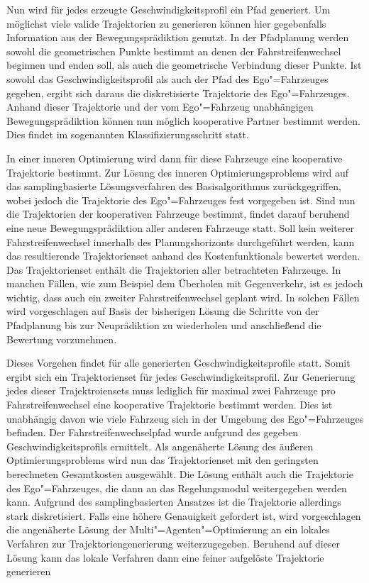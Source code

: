 Nun wird f\"ur jedes erzeugte Geschwindigkeitsprofil ein Pfad generiert.
Um m\"oglichst viele valide Trajektorien zu generieren k\"onnen hier gegebenfalls Information aus der Bewegungspr\"adiktion genutzt.
In der Pfadplanung werden sowohl die geometrischen Punkte bestimmt an denen der Fahrstreifenwechsel beginnen und enden soll, als auch die geometrische Verbindung dieser Punkte.
Ist sowohl das Geschwindigkeitsprofil als auch der Pfad des Ego"=Fahrzeuges gegeben, ergibt sich daraus die diskretisierte Trajektorie des Ego"=Fahrzeuges.
Anhand dieser Trajektorie und der vom Ego"=Fahrzeug unabh\"angigen Bewegungspr\"adiktion k\"onnen nun m\"oglich kooperative Partner bestimmt werden.
Dies findet im sogenannten Klassifizierungsschritt statt.

In einer inneren Optimierung wird dann f\"ur diese Fahrzeuge eine kooperative Trajektorie bestimmt. 
Zur L\"osung des inneren Optimierungsproblems wird auf das samplingbasierte L\"osungsverfahren des Basisalgorithmus zur\"uckgegriffen, wobei jedoch die Trajektorie des Ego"=Fahrzeuges fest vorgegeben ist.
Sind nun die Trajektorien der kooperativen Fahrzeuge bestimmt, findet darauf beruhend eine neue Bewegungspr\"adiktion aller anderen Fahrzeuge statt.
Soll kein weiterer Fahrstreifenwechsel innerhalb des Planungshorizonts durchgef\"uhrt werden, kann das resultierende Trajektorienset anhand des Kostenfunktionals bewertet werden.
Das Trajektorienset enth\"alt die Trajektorien aller betrachteten Fahrzeuge.
In manchen F\"allen, wie zum Beispiel dem \"Uberholen mit Gegenverkehr, ist es jedoch wichtig, dass auch ein zweiter Fahrstreifenwechsel geplant wird.
In solchen F\"allen wird vorgeschlagen auf Basis der bisherigen L\"osung die Schritte von der Pfadplanung bis zur Neupr\"adiktion zu wiederholen und anschlie{\ss}end die Bewertung vorzunehmen.

Dieses Vorgehen findet f\"ur alle generierten Geschwindigkeitsprofile statt.
Somit ergibt sich ein Trajektorienset f\"ur jedes Geschwindigkeitsprofil.
Zur Generierung jedes dieser Trajektroiensets muss lediglich f\"ur maximal zwei Fahrzeuge pro Fahrstreifenwechsel eine kooperative Trajektorie bestimmt werden.
Dies ist unabh\"angig davon wie viele Fahrzeug sich in der Umgebung des Ego"=Fahrzeuges befinden.
Der Fahrstreifenwechselpfad wurde aufgrund des gegeben Geschwindigkeitsprofils ermittelt.
Als angen\"aherte L\"osung des \"au{\ss}eren Optimierungsproblems wird nun das Trajektorienset mit den geringsten berechneten Gesamtkosten ausgew\"ahlt.
Die L\"osung enth\"alt auch die Trajektorie des Ego"=Fahrzeuges, die dann an das Regelungsmodul weitergegeben werden kann.
Aufgrund des samplingbasierten Ansatzes ist die Trajektorie allerdings stark diskretisiert.
Falls eine h\"ohere Genauigkeit gefordert ist, wird vorgeschlagen die angen\"aherte L\"osung der Multi"=Agenten"=Optimierung an ein lokales Verfahren zur Trajektoriengenerierung weiterzugegeben.
Beruhend auf dieser L\"osung kann das lokale Verfahren dann eine feiner aufgel\"oste Trajektorie generieren

